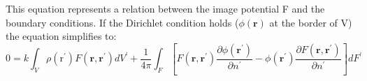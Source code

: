 This equation represents a relation between the image potential F and the boundary conditions.
If the Dirichlet condition holds ($\phi(\textbf{r})$ at the border of V) the equation simplifies to:
\begin{equation}
    0=k \int_{V} \rho\left(\mathrm{r}^{\prime}\right) F\left(\mathbf{r}, \mathbf{r}^{\prime}\right) d V^{\prime}+\frac{1}{4 \pi} \int_{F}\left[F\left(\mathbf{r}, \mathbf{r}^{\prime}\right) \frac{\partial \phi\left(\mathbf{r}^{\prime}\right)}{\partial n^{\prime}}-\phi\left(\mathbf{r}^{\prime}\right) \frac{\partial F\left(\mathbf{r}, \mathbf{r}^{\prime}\right)}{\partial n^{\prime}}\right] d F^{\prime}
    \end{equation}
    
